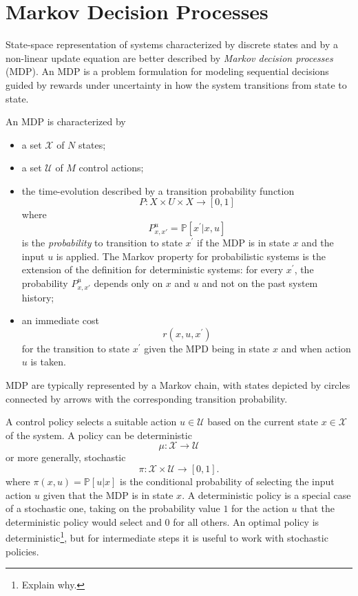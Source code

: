 \chapter{Markov Decision Processes}
\label{chap:markov-decision-processes}

State-space representation of systems characterized by discrete states and by a non-linear update equation are better described by \emph{Markov decision processes} (MDP). An MDP is a problem formulation for modeling sequential decisions guided by rewards under uncertainty in how the system transitions from state to state.

An MDP is characterized by
\begin{itemize}
\item a set $\mathcal{X}$ of $N$ states;
\item a set $\mathcal{U}$ of $M$ control actions;
\item the time-evolution described by a transition probability function
  \begin{equation*}
    P : X\times U\times X \rightarrow [0,1]
  \end{equation*}
  where
  \begin{equation*}
    P^u_{x,x\prime} = \mathbb{P}[x^\prime |x,u]
  \end{equation*}
  is the \emph{probability} to transition to state $x^\prime$ if the MDP is in state $x$ and the input $u$ is applied. The Markov property for probabilistic systems is the extension of the definition for deterministic systems: for every $x^\prime$, the probability $P^u_{x,x\prime}$ depends only on $x$ and $u$ and not on the past system history;
\item an immediate cost
  \begin{equation*}
    r(x,u,x^\prime)
  \end{equation*}
  for the transition to state $x^\prime$ given the MPD being in state $x$ and when action $u$ is taken.
\end{itemize}
MDP are typically represented by a Markov chain, with states depicted by circles connected by arrows with the corresponding transition probability.

A control policy selects a suitable action $u\in \mathcal{U}$ based on the current state $x\in \mathcal{X}$ of the system. A policy can be deterministic
\begin{equation*}
  \mu : \mathcal{X} \rightarrow \mathcal{U}
\end{equation*}
or more generally, stochastic
\begin{equation*}
  \pi : \mathcal{X} \times \mathcal{U} \rightarrow [0,1].
\end{equation*}
where $\pi(x,u) = \mathbb{P}[u|x]$ is the conditional probability of selecting the input action $u$ given that the MDP is in state $x$. A deterministic policy is a special case of a stochastic one, taking on the probability value $1$ for the action $u$ that the deterministic policy would select and $0$ for all others. An optimal policy is deterministic\footnote{Explain why.}, but for intermediate steps it is useful to work with stochastic policies.

